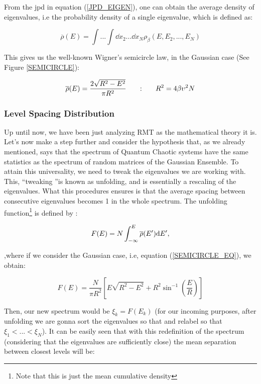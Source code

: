 \documentclass[11pt,a4paper]{article}
\begin{document}
From the jpd in equation (\ref{JPD_EIGEN}), one can obtain the average density of eigenvalues, i.e the probability density of a single eigenvalue, which is defined as: 

\begin{equation}
    \overline{\rho}(E)=\int...\int \dd x_2...\dd x_N \rho_\beta(E,E_2,...,E_N)
\end{equation}

{\noindent This gives us the well-known Wigner's semicircle law, in the Gaussian case \cite{wigner_characteristic_1955} (See Figure \ref{SEMICIRCLE}):}

\begin{equation}\LA{SEMICIRCLE_EQ}
    \overline{\rho}(E) = \frac{2\sqrt{R^2-E^2}}{\pi R^2} ~~~~~ : ~~~~~ R^2 = 4\beta \upsilon^2 N
\end{equation}

\subsubsection{Level Spacing Distribution}

Up until now, we have been just analyzing RMT as the mathematical theory it is. Let's now make a step further and consider the hypothesis that, as we already mentioned, says that the spectrum of Quantum Chaotic systems have the same statistics as the spectrum of random matrices of the Gaussian Ensemble. To attain this universality, we need to tweak the eigenvalues we are working with. This, \textquotedblleft tweaking \textquotedblright is known as unfolding, and is essentially a rescaling of the eigenvalues. What this procedures ensures is that the average spacing between consecutive eigenvalues becomes 1 in the whole spectrum. The unfolding function\footnote{Note that this is just the mean cumulative density} is defined by \cite{pandey_quantum_2019}:

\begin{equation}\LA{UNF_FUNC}
    F(E) = N \int_{-\infty}^E \overline{\rho}(E')\dd E',
\end{equation}

{\noindent ,where if we consider the Gaussian case, i.e, equation (\ref{SEMICIRCLE_EQ}), we obtain:}

\begin{equation}
    F(E) = \frac{N}{\pi R^2}\left[E\sqrt{R^2-E^2}+R^2\sin^{-1}\left(\frac{E}{R}\right)\right]
\end{equation}

Then, our new spectrum would be $\xi_k = F(E_k)$ (for our incoming purposes, after unfolding we are gonna sort the eigenvalues so that and relabel so that $\xi_1<...<\xi_N$). It can be easily seen that with this redefinition of the spectrum (considering that the eigenvalues are sufficiently close) the mean separation between closest levels will be:
\end{document}
